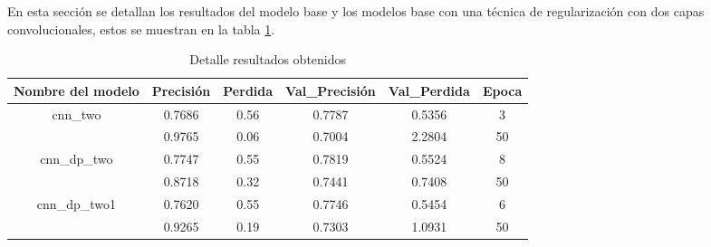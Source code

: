 En esta sección se detallan los resultados del modelo base y  los modelos  base con una técnica de regularización con dos capas convolucionales, estos se muestran en  la tabla \ref{tbl:12}.

\begin{table}[!ht]
	\centering
	\begin{tabular}{|c|c|c|c|c|c|}
		\hline
		\textbf{Nombre del modelo} & \textbf{Precisión} & \textbf{Perdida} & \textbf{Val\_Precisión} & \textbf{Val\_Perdida} & \textbf{Epoca} \\ \hline
		cnn\_two & 0.7686 & 0.56 & 0.7787 & 0.5356 & 3 \\ \cline{2-6}
		~ & 0.9765 & 0.06 & 0.7004 & 2.2804 & 50 \\ \hline
		cnn\_dp\_two & 0.7747 & 0.55 & 0.7819 & 0.5524 & 8 \\ \cline{2-6}
		~ & 0.8718 & 0.32 & 0.7441 & 0.7408 & 50 \\ \hline
		cnn\_dp\_two1 & 0.7620 & 0.55 & 0.7746 & 0.5454 & 6 \\ \cline{2-6}
		~ & 0.9265 & 0.19 & 0.7303 & 1.0931 & 50 \\ \hline
	\end{tabular}
	\caption{Detalle resultados obtenidos}
	\label{tbl:12}
\end{table}



